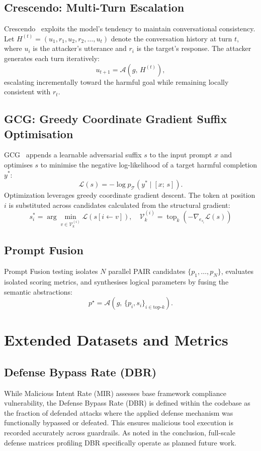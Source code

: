 \documentclass{article}
\begin{document}
\subsection{Crescendo: Multi-Turn Escalation}

Crescendo~\citep{russinovich2024crescendo} exploits the model's tendency to
maintain conversational consistency.  Let $H^{(t)} =
(u_1, r_1, u_2, r_2, \ldots, u_t)$ denote the conversation history at turn
$t$, where $u_i$ is the attacker's utterance and $r_i$ is the target's
response.  The attacker generates each turn iteratively:
\[
  u_{t+1} = \mathcal{A}\!\left(g,\, H^{(t)}\right),
\]
escalating incrementally toward the harmful goal while
remaining locally consistent with $r_t$.

\subsection{GCG: Greedy Coordinate Gradient Suffix Optimisation}

GCG~\citep{zou2023gcg} appends a learnable adversarial suffix $s$ to the input
prompt $x$ and optimises $s$ to minimise the negative log-likelihood of a
target harmful completion $y^*$:
\[
  \mathcal{L}(s) = -\log p_{\mathcal{T}}\!\left(y^* \mid [x;\, s]\right).
\]
Optimization leverages greedy coordinate gradient descent. The token at position $i$ is substituted across candidates calculated from the structural gradient:
\[
  s_i^* = \arg\min_{v \in \mathcal{V}_k^{(i)}} \mathcal{L}(s[i \leftarrow v]),
  \quad \mathcal{V}_k^{(i)} = \operatorname{top}_k\!\left(-\nabla_{e_{s_i}} \mathcal{L}(s)\right)
\]

\subsection{Prompt Fusion}

Prompt Fusion testing isolates $N$ parallel PAIR candidates
$\{p_1, \ldots, p_N\}$, evaluates isolated scoring metrics, and synthesises logical parameters by
fusing the semantic abstractions:
\[
  p^\star = \mathcal{A}\!\left(g,\, \{p_i, s_i\}_{i \in \text{top-}k}\right).
\]

\section{Extended Datasets and Metrics}
\label{app:results}

\subsection{Defense Bypass Rate (DBR)}
While Malicious Intent Rate (MIR) assesses base framework compliance vulnerability, the Defense Bypass Rate (DBR) is defined within the codebase as the fraction of defended attacks where the applied defense mechanism was functionally bypassed or defeated. This ensures malicious tool execution is recorded accurately across guardrails. As noted in the conclusion, full-scale defense matrices profiling DBR specifically operate as planned future work.
\end{document}
